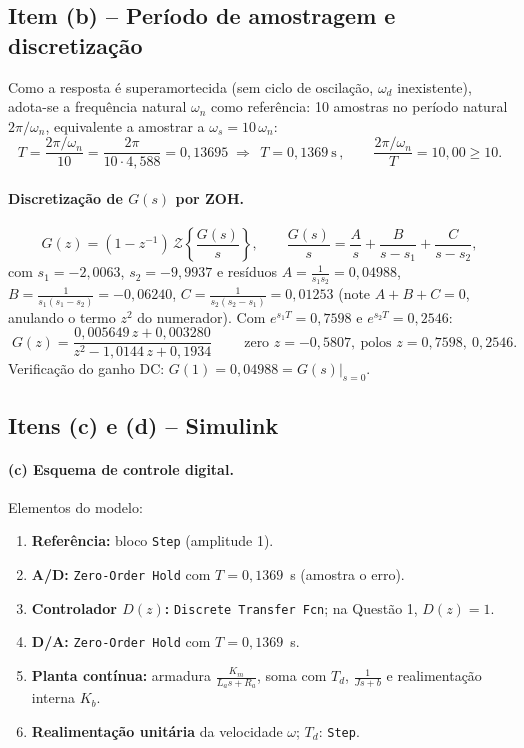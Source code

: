 \documentclass[11pt,a4paper]{article}
\begin{document}
\subsection{Item (b) -- Per\'iodo de amostragem e discretiza\c{c}\~ao}

Como a resposta \'e superamortecida (sem ciclo de oscila\c{c}\~ao, $\omega_d$ inexistente),
adota-se a frequ\^encia natural $\omega_n$ como refer\^encia: 10 amostras no per\'iodo natural
$2\pi/\omega_n$, equivalente a amostrar a $\omega_s=10\,\omega_n$:
\begin{equation}
T=\frac{2\pi/\omega_n}{10}=\frac{2\pi}{10\cdot 4{,}588}=0{,}13695
\;\Rightarrow\; \boxed{\,T = 0{,}1369~\mathrm{s}\,},
\qquad \frac{2\pi/\omega_n}{T}=10{,}00\ge 10 .
\end{equation}

\paragraph{Discretiza\c{c}\~ao de $G(s)$ por ZOH.}
\begin{equation}
G(z)=(1-z^{-1})\,\mathcal{Z}\!\left\{\frac{G(s)}{s}\right\},
\qquad
\frac{G(s)}{s}=\frac{A}{s}+\frac{B}{s-s_1}+\frac{C}{s-s_2},
\end{equation}
com $s_1=-2{,}0063$, $s_2=-9{,}9937$ e res\'iduos
$A=\tfrac{1}{s_1 s_2}=0{,}04988$, $B=\tfrac{1}{s_1(s_1-s_2)}=-0{,}06240$,
$C=\tfrac{1}{s_2(s_2-s_1)}=0{,}01253$ (note $A+B+C=0$, anulando o termo $z^2$ do numerador).
Com $e^{s_1 T}=0{,}7598$ e $e^{s_2 T}=0{,}2546$:
\begin{equation}
\boxed{\;G(z)=\dfrac{0{,}005649\,z+0{,}003280}{z^2-1{,}0144\,z+0{,}1934}\;}
\qquad \text{zero } z=-0{,}5807,\ \text{polos } z=0{,}7598,\ 0{,}2546 .
\end{equation}
Verifica\c{c}\~ao do ganho DC: $G(1)=0{,}04988=G(s)\big|_{s=0}$.

\subsection{Itens (c) e (d) -- Simulink}

\paragraph{(c) Esquema de controle digital.} Elementos do modelo:
\begin{enumerate}
  \item \textbf{Refer\^encia:} bloco \texttt{Step} (amplitude 1).
  \item \textbf{A/D:} \texttt{Zero-Order Hold} com $T=0{,}1369$~s (amostra o erro).
  \item \textbf{Controlador $D(z)$:} \texttt{Discrete Transfer Fcn}; na Quest\~ao 1, $D(z)=1$.
  \item \textbf{D/A:} \texttt{Zero-Order Hold} com $T=0{,}1369$~s.
  \item \textbf{Planta cont\'inua:} armadura $\frac{K_m}{L_a s+R_a}$, soma com $T_d$,
        $\frac{1}{Js+b}$ e realimenta\c{c}\~ao interna $K_b$.
  \item \textbf{Realimenta\c{c}\~ao unit\'aria} da velocidade $\omega$; \textbf{$T_d$}: \texttt{Step}.
\end{enumerate}
\end{document}
